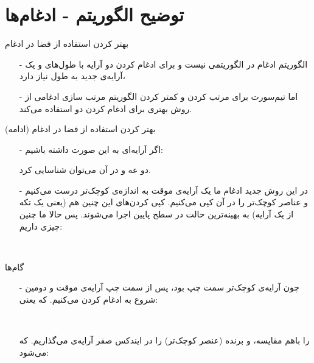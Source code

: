 \section{توضیح الگوریتم - ادغام‌ها}
\begin{frame}{بهتر کردن استفاده از فضا در ادغام}
\begin{itemize}\itemr
\item[-]
الگوریتم ادغام در  الگوریتمی  نیست و برای ادغام کردن دو آرایه با طول‌های
و
یک آرایه‌ی جدید به طول
نیاز دارد،
\item[-]
اما تیم‌سورت برای  مرتب کردن و کمتر کردن 
الگوریتم مرتب سازی ادغامی از روش بهتری برای ادغام کردن دو  استفاده می‌کند.
\end{itemize}
\end{frame}

\begin{frame}{بهتر کردن استفاده از فضا در ادغام (ادامه)}
\begin{itemize}\itemr
\item[-]
اگر آرایه‌ای به این صورت داشته باشیم:
\begin{lfl}
\end{lfl}
دو  عه 
و
در آن می‌توان شناسایی کرد.

\item[-]
در این روش جدید ادغام ما یک آرایه‌ی موقت به اندازه‌ی  کوچک‌تر درست می‌کنیم و عناصر  کوچک‌تر را در آن کپی می‌کنیم. کپی کردن‌های این چنین هم (یعنی یک تکه از یک آرایه) به بهینه‌ترین حالت در سطح پایین اجرا می‌شوند. پس حالا ما چنین چیزی داریم:

\begin{lfl}
\\
\end{lfl}
\end{itemize}
\end{frame}

\begin{frame}{گام‌ها}
\begin{itemize}\itemr
\item[-]
چون آرایه‌ی کوچک‌تر سمت چپ بود، پس از سمت چپ‌ آرایه‌ی موقت و دومین  شروع به ادغام کردن می‌کنیم. که یعنی:
\begin{lfl}
\\
\end{lfl}
را باهم مقایسه، و برنده (عنصر کوچک‌تر) را در ایندکس صفر آرایه‌ی  می‌گذاریم. که می‌شود:

\begin{lfl}
\\
\end{lfl}
\end{itemize}
\end{frame}

